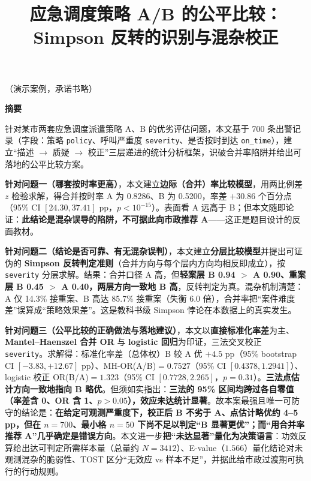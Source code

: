\documentclass[12pt,a4paper]{ctexart}
\title{\textbf{应急调度策略 A/B 的公平比较：Simpson 反转的识别与混杂校正}}
\author{}
\date{}
\begin{document}
\thispagestyle{empty}
\noindent （演示案例，承诺书略）
\newpage

\maketitle
\vspace{-2em}
\begin{center}\textbf{\large 摘\quad 要}\end{center}
\noindent
针对某市两套应急调度派遣策略 A、B 的优劣评估问题，本文基于 700 条出警记录（字段：策略 \texttt{policy}、呼叫严重度 \texttt{severity}、是否按时到达 \texttt{on\_time}），建立``描述 $\to$ 质疑 $\to$ 校正''三层递进的统计分析框架，识破合并率陷阱并给出可落地的公平比较方案。

\textbf{针对问题一（哪套按时率更高）}，本文建立\textbf{边际（合并）率比较模型}，用两比例差 $z$ 检验求解，得合并按时率 A 为 0.8286、B 为 0.5200，率差 $+30.86$ 个百分点（95\% CI $[24.30,37.41]$ pp，$p<10^{-15}$）。表面看 A 远高于 B；但本文随即论证：\textbf{此结论是混杂误导的陷阱，不可据此向市政推荐 A}——这正是题目设计的反面教材。

\textbf{针对问题二（结论是否可靠、有无混杂误判）}，本文建立\textbf{分层比较模型}并提出可证伪的 \textbf{Simpson 反转判定准则}（合并方向与每个层内方向均相反即成立），按 \texttt{severity} 分层求解。结果：合并口径 A 高，但\textbf{轻案层 B 0.94 $>$ A 0.90、重案层 B 0.45 $>$ A 0.40，两层方向一致地 B 高}，反转判定为真。混杂机制清楚：A 仅 14.3\% 接重案、B 高达 85.7\% 接重案（失衡 6.0 倍），合并率把``案件难度差''误算成``策略效果差''。这是教科书级 Simpson 悖论在本数据上的真实发生。

\textbf{针对问题三（公平比较的正确做法与落地建议）}，本文以\textbf{直接标准化率差}为主、\textbf{Mantel--Haenszel 合并 OR} 与 \textbf{logistic 回归}为印证，三法交叉校正 \texttt{severity}。求解得：标准化率差（总体权）B 较 A 优 $+4.5$ pp（95\% bootstrap CI $[-3.83,+12.67]$ pp）、MH-OR(A/B)$=0.7527$（95\% CI $[0.4378,1.2941]$）、logistic 校正 OR(B/A)$=1.323$（95\% CI $[0.7728,2.265]$，$p=0.31$）。\textbf{三法点估计方向一致地指向 B 略优}。但须如实指出：\textbf{三法的 95\% 区间均跨过各自零值（率差含 0、OR 含 1、$p>0.05$），效应未达统计显著}。故本案最强且唯一可防守的结论是：\textbf{在给定可观测严重度下，校正后 B 不劣于 A、点估计略优约 4--5 pp，但在 $n=700$、最小格 $n=50$ 下尚不足以判定``B 显著更优''；而``用合并率推荐 A''几乎确定是错误方向}。本文进一步\textbf{把``未达显著''量化为决策语言}：功效反算给出达可判定所需样本量（总量约 $N=3412$）、E-value（$1.566$）量化结论对未观测混杂的脆弱性、TOST 区分``无效应 vs 样本不足''，并据此给市政过渡期可执行的行动规则。
\end{document}
